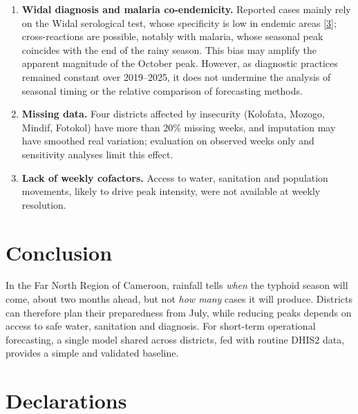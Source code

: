 \documentclass[11pt]{article}
\begin{document}
\begin{enumerate}[label=\arabic*.,leftmargin=1.6em]
\item \textbf{Widal diagnosis and malaria co-endemicity.} Reported cases mainly rely on the Widal serological test, whose specificity is low in endemic areas [\hyperlink{ref3}{3}]; cross-reactions are possible, notably with malaria, whose seasonal peak coincides with the end of the rainy season. This bias may amplify the apparent magnitude of the October peak. However, as diagnostic practices remained constant over 2019–2025, it does not undermine the analysis of seasonal timing or the relative comparison of forecasting methods.
\item \textbf{Missing data.} Four districts affected by insecurity (Kolofata, Mozogo, Mindif, Fotokol) have more than 20\% missing weeks, and imputation may have smoothed real variation; evaluation on observed weeks only and sensitivity analyses limit this effect.
\item \textbf{Lack of weekly cofactors.} Access to water, sanitation and population movements, likely to drive peak intensity, were not available at weekly resolution.
\end{enumerate}

\section{Conclusion}
In the Far North Region of Cameroon, rainfall tells \textit{when} the typhoid season will come, about two months ahead, but not \textit{how many} cases it will produce. Districts can therefore plan their preparedness from July, while reducing peaks depends on access to safe water, sanitation and diagnosis. For short-term operational forecasting, a single model shared across districts, fed with routine DHIS2 data, provides a simple and validated baseline.

\section*{Declarations}
\end{document}
